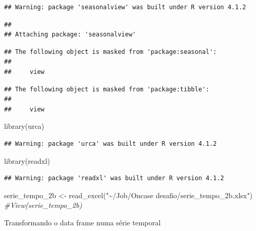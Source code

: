 \documentclass[
]{article}
\newenvironment{Shaded}{\begin{snugshade}}{\end{snugshade}}
\newcommand{\AttributeTok}[1]{\textcolor[rgb]{0.77,0.63,0.00}{#1}}
\newcommand{\CommentTok}[1]{\textcolor[rgb]{0.56,0.35,0.01}{\textit{#1}}}
\newcommand{\DecValTok}[1]{\textcolor[rgb]{0.00,0.00,0.81}{#1}}
\newcommand{\FunctionTok}[1]{\textcolor[rgb]{0.00,0.00,0.00}{#1}}
\newcommand{\NormalTok}[1]{#1}
\newcommand{\OtherTok}[1]{\textcolor[rgb]{0.56,0.35,0.01}{#1}}
\newcommand{\SpecialCharTok}[1]{\textcolor[rgb]{0.00,0.00,0.00}{#1}}
\newcommand{\StringTok}[1]{\textcolor[rgb]{0.31,0.60,0.02}{#1}}
\begin{document}
\begin{verbatim}
## Warning: package 'seasonalview' was built under R version 4.1.2
\end{verbatim}

\begin{verbatim}
## 
## Attaching package: 'seasonalview'
\end{verbatim}

\begin{verbatim}
## The following object is masked from 'package:seasonal':
## 
##     view
\end{verbatim}

\begin{verbatim}
## The following object is masked from 'package:tibble':
## 
##     view
\end{verbatim}

\begin{Shaded}
\begin{Highlighting}[]
\FunctionTok{library}\NormalTok{(urca)}
\end{Highlighting}
\end{Shaded}

\begin{verbatim}
## Warning: package 'urca' was built under R version 4.1.2
\end{verbatim}

\begin{Shaded}
\begin{Highlighting}[]
\FunctionTok{library}\NormalTok{(readxl)}
\end{Highlighting}
\end{Shaded}

\begin{verbatim}
## Warning: package 'readxl' was built under R version 4.1.2
\end{verbatim}

\begin{Shaded}
\begin{Highlighting}[]
\NormalTok{serie\_tempo\_2b }\OtherTok{\textless{}{-}} \FunctionTok{read\_excel}\NormalTok{(}\StringTok{"\textasciitilde{}/Job/Oncase desafio/serie\_tempo\_2b.xlsx"}\NormalTok{)}
\CommentTok{\#View(serie\_tempo\_2b)}
\end{Highlighting}
\end{Shaded}

Transformando o data frame numa série temporal

\begin{Shaded}
\end{Shaded}
\end{document}
